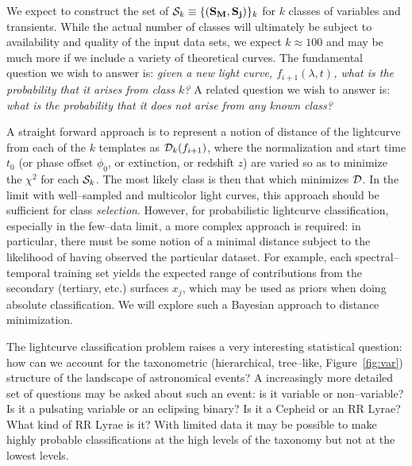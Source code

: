  \smallskip

We expect to construct the set of  ${\cal S}_k \equiv \{({\bf S_M},{\bf
S_j})\}_k$ for $k$ classes of variables and transients. While the actual number
of classes will ultimately be subject to availability and quality of the input
data sets, we expect $k \approx 100$ and may be much more if we include a
variety of theoretical curves. The fundamental question we wish to answer is:
{\it given a new light curve, $f_{i+1}(\lambda, t)$, what is the probability
that it arises from class $k$?}  A related question we wish to answer is: {\it
what is the probability that it does not arise from any known class?}

A straight forward approach is to represent a notion of distance of the
lightcurve from each of the $k$ templates as ${\cal D}_k(f_{i+1})$, where the
normalization and start time $t_0$ (or phase offset $\phi_0$, or extinction, or
redshift $z$) are varied so as to minimize the $\chi^2$ for each ${\cal S}_k$.
The most likely class is then that which minimizes ${\cal D}$. In the limit with
well--sampled and multicolor light curves, this approach should be sufficient
for class {\it selection}. However, for probabilistic lightcurve classification,
especially in the few--data limit, a more complex approach is required: in
particular, there must be some notion of a minimal distance subject to the
likelihood of having observed the particular dataset.  For example, each
spectral--temporal training set yields the expected range of contributions from
the secondary (tertiary, etc.) surfaces $x_j$, which may be used as priors when
doing absolute classification. We will explore such a Bayesian approach to
distance minimization.

The lightcurve classification problem raises a very interesting statistical
question: how can we account for the taxonometric (hierarchical, tree--like,
Figure~\ref{fig:var}) structure of the landscape of astronomical events? A
increasingly more detailed set of questions may be asked about such an event: is
it variable or non--variable? Is it a pulsating variable or an eclipsing binary?
Is it a Cepheid or an RR Lyrae? What kind of RR Lyrae is it?  With limited data
it may be possible to make highly probable classifications at the high levels of
the taxonomy but not at the lowest levels.

